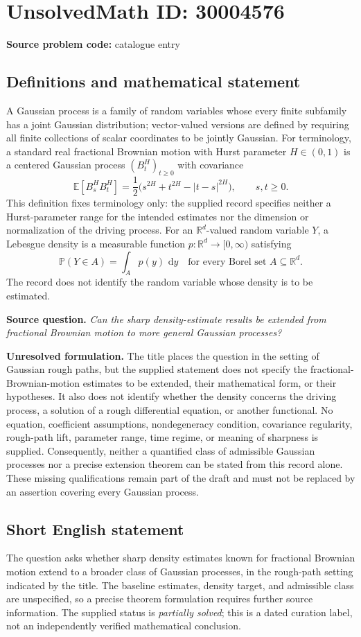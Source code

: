 \documentclass[11pt]{article}
\newcommand{\R}{\mathbb{R}}
\newcommand{\E}{\mathbb{E}}
\newcommand{\dd}{\,\mathrm{d}}
\begin{document}
\section*{UnsolvedMath ID: 30004576}
\textbf{Source problem code:} catalogue entry
\subsection{Definitions and mathematical statement}
A Gaussian process is a family of random variables whose every finite subfamily has a joint Gaussian distribution; vector-valued versions are defined by requiring all finite collections of scalar coordinates to be jointly Gaussian. For terminology, a standard real fractional Brownian motion with Hurst parameter \(H\in(0,1)\) is a centered Gaussian process \((B_t^H)_{t\geq0}\) with covariance
\[
\E[B_s^H B_t^H]=\frac12\bigl(s^{2H}+t^{2H}-|t-s|^{2H}\bigr),\qquad s,t\geq0.
\]
This definition fixes terminology only: the supplied record specifies neither a Hurst-parameter range for the intended estimates nor the dimension or normalization of the driving process. For an \(\R^d\)-valued random variable \(Y\), a Lebesgue density is a measurable function \(p:\R^d\to[0,\infty)\) satisfying
\[
\mathbb P(Y\in A)=\int_A p(y)\,\dd y
\quad\text{for every Borel set }A\subseteq\R^d.
\]
The record does not identify the random variable whose density is to be estimated.

\textbf{Source question.} \emph{Can the sharp density-estimate results be extended from fractional Brownian motion to more general Gaussian processes?}

\textbf{Unresolved formulation.} The title places the question in the setting of Gaussian rough paths, but the supplied statement does not specify the fractional-Brownian-motion estimates to be extended, their mathematical form, or their hypotheses. It also does not identify whether the density concerns the driving process, a solution of a rough differential equation, or another functional. No equation, coefficient assumptions, nondegeneracy condition, covariance regularity, rough-path lift, parameter range, time regime, or meaning of sharpness is supplied. Consequently, neither a quantified class of admissible Gaussian processes nor a precise extension theorem can be stated from this record alone. These missing qualifications remain part of the draft and must not be replaced by an assertion covering every Gaussian process.
\subsection{Short English statement}
The question asks whether sharp density estimates known for fractional Brownian motion extend to a broader class of Gaussian processes, in the rough-path setting indicated by the title. The baseline estimates, density target, and admissible class are unspecified, so a precise theorem formulation requires further source information. The supplied status is \emph{partially solved}; this is a dated curation label, not an independently verified mathematical conclusion.
\end{document}
